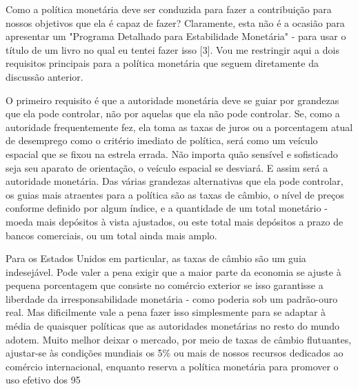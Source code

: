 \documentclass[12pt]{article}
\begin{document}
Como a política monetária deve ser conduzida para fazer a contribuição para nossos objetivos que ela é capaz de fazer? Claramente, esta não é a ocasião para apresentar um "Programa Detalhado para Estabilidade Monetária" - para usar o título de um livro no qual eu tentei fazer isso [3]. Vou me restringir aqui a dois requisitos principais para a política monetária que seguem diretamente da discussão anterior.

O primeiro requisito é que a autoridade monetária deve se guiar por grandezas que ela pode controlar, não por aquelas que ela não pode controlar. Se, como a autoridade frequentemente fez, ela toma as taxas de juros ou a porcentagem atual de desemprego como o critério imediato de política, será como um veículo espacial que se fixou na estrela errada. Não importa quão sensível e sofisticado seja seu aparato de orientação, o veículo espacial se desviará. E assim será a autoridade monetária. Das várias grandezas alternativas que ela pode controlar, os guias mais atraentes para a política são as taxas de câmbio, o nível de preços conforme definido por algum índice, e a quantidade de um total monetário - moeda mais depósitos à vista ajustados, ou este total mais depósitos a prazo de bancos comerciais, ou um total ainda mais amplo.

Para os Estados Unidos em particular, as taxas de câmbio são um guia indesejável. Pode valer a pena exigir que a maior parte da economia se ajuste à pequena porcentagem que consiste no comércio exterior se isso garantisse a liberdade da irresponsabilidade monetária - como poderia sob um padrão-ouro real. Mas dificilmente vale a pena fazer isso simplesmente para se adaptar à média de quaisquer políticas que as autoridades monetárias no resto do mundo adotem. Muito melhor deixar o mercado, por meio de taxas de câmbio flutuantes, ajustar-se às condições mundiais os 5\% ou mais de nossos recursos dedicados ao comércio internacional, enquanto reserva a política monetária para promover o uso efetivo dos 95%
\end{document}
